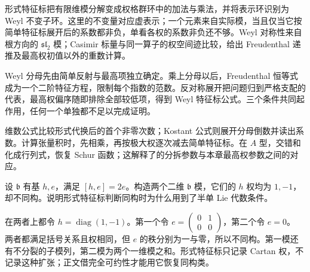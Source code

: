 






\begin{chaptersummary}
	形式特征标把有限维模分解变成权格群环中的加法与乘法，并将表示环识别为 Weyl 不变子环。这里的不变量对应虚表示；一个元素来自实际模，当且仅当它按简单特征标展开后的系数都非负，单看各权的系数非负还不够。Weyl 对称性来自根方向的 \(\mathfrak{sl}_2\) 模；Casimir 标量与同一算子的权空间迹比较，给出 Freudenthal 递推及最高权初值以外的重数计算。

	\ProseParagraphBreak
	Weyl 分母先由简单反射与最高项独立确定。乘上分母以后，Freudenthal 恒等式成为一个二阶特征方程，限制每个指数的范数。反对称展开把问题归到严格支配的代表，最高权偏序随即排除全部较低项，得到 Weyl 特征标公式。三个条件共同起作用，任何一个单独都不足以完成证明。

	\ProseParagraphBreak
	维数公式比较形式代换后的首个非零次数；Kostant 公式则展开分母倒数并读出系数。计算张量积时，先相乘，再按极大权逐次减去简单特征标。在 \(A\) 型，交错和化成行列式，恢复 Schur 函数；这解释了的分拆参数与本章最高权参数之间的对应。
\end{chaptersummary}

\BookExercises

\begin{exercise}\label{b5:ex:19-nonsemisimple-character}
	设 \(\mathfrak b\) 有基 \(h,e\)，满足 \([h,e]=2e\)。构造两个二维 \(\mathfrak b\) 模，它们的 \(h\) 权均为 \(1,-1\)，却不同构。说明形式特征标判断同构时为什么用到了半单 Lie 代数条件。
\end{exercise}
\begin{solution}
	在两者上都令 \(h=\operatorname{diag}(1,-1)\)。第一个令
	\(e=\begin{pmatrix}0&1\\0&0\end{pmatrix}\)，第二个令 \(e=0\)。
	两者都满足括号关系且权相同，但 \(e\) 的秩分别为一与零，所以不同构。第一模还有不分裂的子模列，第二模为两个一维模之和。形式特征标只记录 Cartan 权，不记录这种扩张；正文借完全可约性才能用它恢复同构类。
\end{solution}

